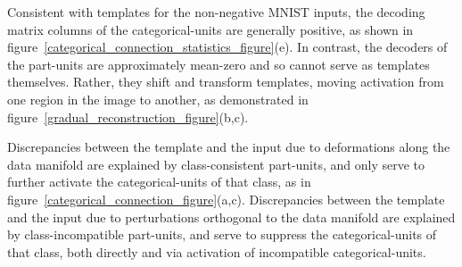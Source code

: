 \documentclass{article} %
\begin{document}
Consistent with templates for the non-negative MNIST inputs, the decoding matrix columns of the categorical-units are generally positive, as shown in figure~\ref{categorical_connection_statistics_figure}(e).  In contrast, the decoders of the part-units are approximately mean-zero and so cannot serve as templates themselves.  Rather, they shift and transform templates, moving activation from one region in the image to another, as demonstrated in figure~\ref{gradual_reconstruction_figure}(b,c).



Discrepancies between the template and the input due to deformations along the data manifold are explained by class-consistent part-units, and only serve to further activate the categorical-units of that class, as in figure~\ref{categorical_connection_figure}(a,c).
Discrepancies between the template and the input due to perturbations orthogonal to the data manifold are explained by class-incompatible part-units, and serve to suppress the categorical-units of that class, both directly and via activation of incompatible categorical-units.  %
\end{document}
